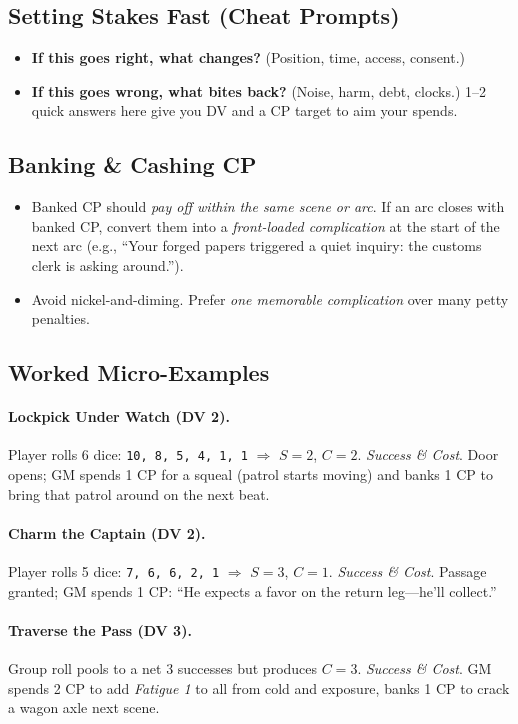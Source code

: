 \documentclass[12pt]{article}
\begin{document}
\subsection{Setting Stakes Fast (Cheat Prompts)}
\begin{itemize}
  \item \textbf{If this goes right, what changes?} (Position, time, access, consent.)
  \item \textbf{If this goes wrong, what bites back?} (Noise, harm, debt, clocks.)
  1--2 quick answers here give you DV and a CP target to aim your spends.
\end{itemize}

\subsection{Banking \& Cashing CP}
\begin{itemize}
  \item Banked CP should \emph{pay off within the same scene or arc}. If an arc closes with banked CP, convert them into a \emph{front-loaded complication} at the start of the next arc (e.g., “Your forged papers triggered a quiet inquiry: the customs clerk is asking around.”).
  \item Avoid nickel-and-diming. Prefer \emph{one memorable complication} over many petty penalties.
\end{itemize}

\subsection{Worked Micro-Examples}
\paragraph{Lockpick Under Watch (DV 2).}
Player rolls 6 dice: \texttt{10, 8, 5, 4, 1, 1} $\Rightarrow$ $S{=}2$, $C{=}2$. \emph{Success \& Cost}. Door opens; GM spends 1 CP for a squeal (patrol starts moving) and banks 1 CP to bring that patrol around on the next beat.

\paragraph{Charm the Captain (DV 2).}
Player rolls 5 dice: \texttt{7, 6, 6, 2, 1} $\Rightarrow$ $S{=}3$, $C{=}1$. \emph{Success \& Cost}. Passage granted; GM spends 1 CP: “He expects a favor on the return leg—he’ll collect.”

\paragraph{Traverse the Pass (DV 3).}
Group roll pools to a net 3 successes but produces $C{=}3$. \emph{Success \& Cost}. GM spends 2 CP to add \emph{Fatigue 1} to all from cold and exposure, banks 1 CP to crack a wagon axle next scene.
\end{document}
